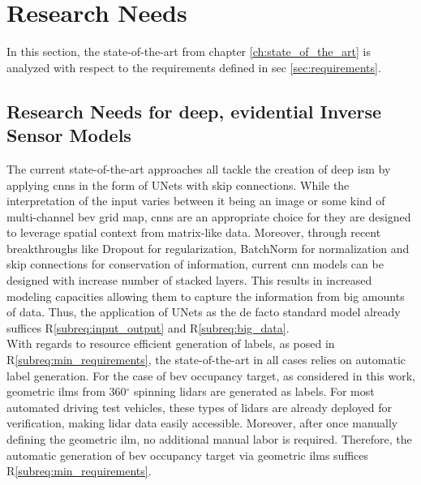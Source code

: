 \section{Research Needs}
\label{sec:research_needs}
In this section, the state-of-the-art from chapter \ref{ch:state_of_the_art} is analyzed with respect to the requirements defined in sec \ref{sec:requirements}.

%
\subsection{Research Needs for deep, evidential Inverse Sensor Models}
\label{subsec:research_needs_for_deep_isms}
The current state-of-the-art approaches all tackle the creation of deep \gls{ism} by applying \gls{cnn}s in the form of UNets with skip connections. While the interpretation of the input varies between it being an image or some kind of multi-channel \gls{bev} grid map, \gls{cnn}s are an appropriate choice for they are designed to leverage spatial context from matrix-like data. Moreover, through recent breakthroughs like Dropout for regularization, BatchNorm for normalization and skip connections for conservation of information, current \gls{cnn} models can be designed with increase number of stacked layers. This results in increased modeling capacities allowing them to capture the information from big amounts of data. Thus, the application of UNets as the de facto standard model already suffices R\ref{subreq:input_output} and R\ref{subreq:big_data}.\\ 
With regards to resource efficient generation of labels, as posed in R\ref{subreq:min_requirements}, the state-of-the-art in all cases relies on automatic label generation. For the case of \gls{bev} occupancy target, as considered in this work, geometric \gls{ilm}s from 360$^\circ$ spinning lidars are generated as labels. For most automated driving test vehicles, these types of lidars are already deployed for verification, making lidar data easily accessible. Moreover, after once manually defining the geometric \gls{ilm}, no additional manual labor is required. Therefore, the automatic generation of \gls{bev} occupancy target via geometric \gls{ilm}s suffices R\ref{subreq:min_requirements}.\\
